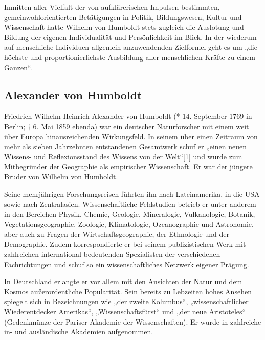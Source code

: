 
Inmitten aller Vielfalt der von aufklärerischen Impulsen bestimmten, gemeinwohlorientierten Betätigungen in Politik, Bildungswesen, Kultur und Wissenschaft hatte Wilhelm von Humboldt stets zugleich die Auslotung und Bildung der eigenen Individualität und Persönlichkeit im Blick. In der wiederum auf menschliche Individuen allgemein anzuwendenden Zielformel geht es um „die höchste und proportionierlichste Ausbildung aller menschlichen Kräfte zu einem Ganzen“.


\subsection{Alexander von Humboldt}
Friedrich Wilhelm Heinrich Alexander von Humboldt (* 14. September 1769 in Berlin; † 6. Mai 1859 ebenda) war ein deutscher Naturforscher mit einem weit über Europa hinausreichenden Wirkungsfeld. In seinem über einen Zeitraum von mehr als sieben Jahrzehnten entstandenen Gesamtwerk schuf er „einen neuen Wissens- und Reflexionsstand des Wissens von der Welt“[1] und wurde zum Mitbegründer der Geographie als empirischer Wissenschaft. Er war der jüngere Bruder von Wilhelm von Humboldt.

Seine mehrjährigen Forschungsreisen führten ihn nach Lateinamerika, in die USA sowie nach Zentralasien. Wissenschaftliche Feldstudien betrieb er unter anderem in den Bereichen Physik, Chemie, Geologie, Mineralogie, Vulkanologie, Botanik, Vegetationsgeographie, Zoologie, Klimatologie, Ozeanographie und Astronomie, aber auch zu Fragen der Wirtschaftsgeographie, der Ethnologie und der Demographie. Zudem korrespondierte er bei seinem publizistischen Werk mit zahlreichen international bedeutenden Spezialisten der verschiedenen Fachrichtungen und schuf so ein wissenschaftliches Netzwerk eigener Prägung.

In Deutschland erlangte er vor allem mit den Ansichten der Natur und dem Kosmos außerordentliche Popularität. Sein bereits zu Lebzeiten hohes Ansehen spiegelt sich in Bezeichnungen wie „der zweite Kolumbus“, „wissenschaftlicher Wiederentdecker Amerikas“, „Wissenschaftsfürst“ und „der neue Aristoteles“ (Gedenkmünze der Pariser Akademie der Wissenschaften). Er wurde in zahlreiche in- und ausländische Akademien aufgenommen.






